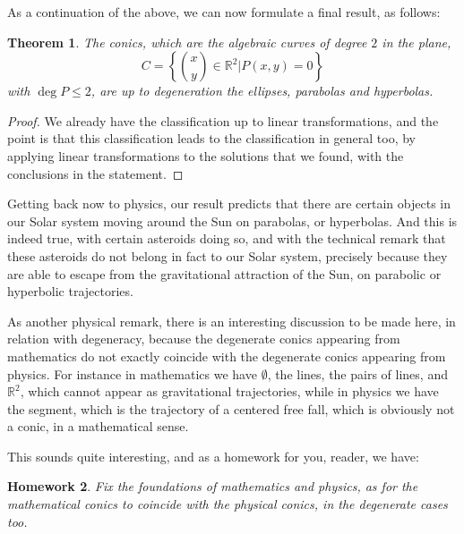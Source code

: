 \documentclass[12pt]{amsbook}
\newtheorem{theorem}{Theorem}[chapter]
\newtheorem{homework}[theorem]{Homework}
\begin{document}
As a continuation of the above, we can now formulate a final result, as follows:


\begin{theorem}
The conics, which are the algebraic curves of degree $2$ in the plane,
$$C=\left\{\binom{x}{y}\in\mathbb R^2\Big|P(x,y)=0\right\}$$
with $\deg P\leq 2$, are up to degeneration the ellipses, parabolas and hyperbolas.
\end{theorem}

\begin{proof}
We already have the classification up to linear transformations, and the point is that this classification leads to the classification in general too, by applying linear transformations to the solutions that we found, with the conclusions in the statement.
\end{proof}

Getting back now to physics, our result predicts that there are certain objects in our Solar system moving around the Sun on parabolas, or hyperbolas. And this is indeed true, with certain asteroids doing so, and with the technical remark that these asteroids do not belong in fact to our Solar system, precisely because they are able to escape from the gravitational attraction of the Sun, on parabolic or hyperbolic trajectories.

\bigskip

As another physical remark, there is an interesting discussion to be made here, in relation with degeneracy, because the degenerate conics appearing from mathematics do not exactly coincide with the degenerate conics appearing from physics. For instance in mathematics we have $\emptyset$, the lines, the pairs of lines, and $\mathbb R^2$, which cannot appear as gravitational trajectories, while in physics we have the segment, which is the trajectory of a centered free fall, which is obviously not a conic, in a mathematical sense.

\bigskip

This sounds quite interesting, and as a homework for you, reader, we have:


\begin{homework}
Fix the foundations of mathematics and physics, as for the mathematical conics to coincide with the physical conics, in the degenerate cases too.
\end{homework}
\end{document}

